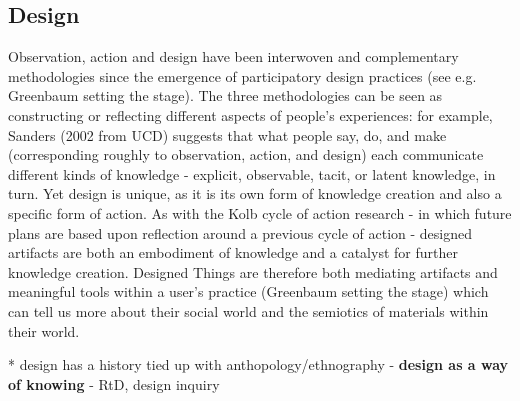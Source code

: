 \subsection{Design}
\label{3-design}

Observation, action and design have been interwoven and complementary methodologies since the emergence of participatory design practices (see e.g. Greenbaum setting the stage). The three methodologies can be seen as constructing or reflecting different aspects of people's experiences: for example, Sanders (2002 from UCD) suggests that what people say, do, and make (corresponding roughly to observation, action, and design) each communicate different kinds of knowledge  - explicit, observable, tacit, or latent knowledge, in turn. Yet design is unique, as it is its own form of knowledge creation and also a specific form of action. As with the Kolb cycle of action research - in which future plans are based upon reflection around a previous cycle of action - designed artifacts are both an embodiment of knowledge and a catalyst for further knowledge creation. Designed Things are therefore both mediating artifacts and meaningful tools within a user's practice (Greenbaum setting the stage) which can tell us more about their social world and the semiotics of materials within their world. 

* design has a history tied up with anthopology/ethnography -\textbf{ design as a way of knowing }- RtD, design inquiry

